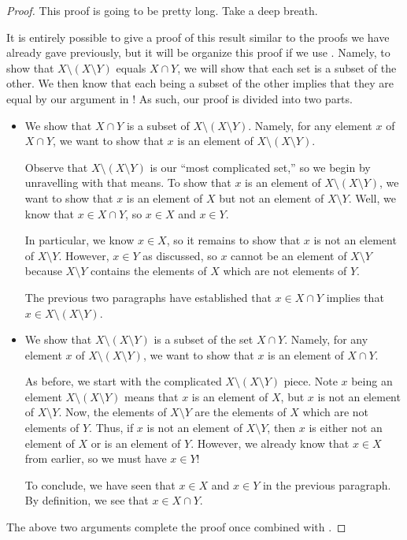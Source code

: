 \documentclass[../notes.tex]{subfiles}
\begin{document}
\begin{proof}
    This proof is going to be pretty long. Take a deep breath.

    It is entirely possible to give a proof of this result similar to the proofs we have already gave previously, but it will be organize this proof if we use . Namely, to show that $X\setminus(X\setminus Y)$ equals $X\cap Y$, we will show that each set is a subset of the other. We then know that each being a subset of the other implies that they are equal by our argument in ! As such, our proof is divided into two parts.
    \begin{itemize}
        \item We show that $X\cap Y$ is a subset of $X\setminus(X\setminus Y)$. Namely, for any element $x$ of $X\cap Y$, we want to show that $x$ is an element of $X\setminus(X\setminus Y)$.

        Observe that $X\setminus(X\setminus Y)$ is our ``most complicated set,'' so we begin by unravelling with that means. To show that $x$ is an element of $X\setminus(X\setminus Y)$, we want to show that $x$ is an element of $X$ but not an element of $X\setminus Y$. Well, we know that $x\in X\cap Y$, so $x\in X$ and $x\in Y$.
        
        In particular, we know $x\in X$, so it remains to show that $x$ is not an element of $X\setminus Y$. However, $x\in Y$ as discussed, so $x$ cannot be an element of $X\setminus Y$ because $X\setminus Y$ contains the elements of $X$ which are not elements of $Y$.

        The previous two paragraphs have established that $x\in X\cap Y$ implies that $x\in X\setminus(X\setminus Y)$.
        
        \item We show that $X\setminus(X\setminus Y)$ is a subset of the set $X\cap Y$. Namely, for any element $x$ of $X\setminus(X\setminus Y)$, we want to show that $x$ is an element of $X\cap Y$.
        
        As before, we start with the complicated $X\setminus(X\setminus Y)$ piece. Note $x$ being an element $X\setminus(X\setminus Y)$ means that $x$ is an element of $X$, but $x$ is not an element of $X\setminus Y$. Now, the elements of $X\setminus Y$ are the elements of $X$ which are not elements of $Y$. Thus, if $x$ is not an element of $X\setminus Y$, then $x$ is either not an element of $X$ or is an element of $Y$. However, we already know that $x\in X$ from earlier, so we must have $x\in Y$!

        To conclude, we have seen that $x\in X$ and $x\in Y$ in the previous paragraph. By definition, we see that $x\in X\cap Y$.
    \end{itemize}
    The above two arguments complete the proof once combined with .
\end{proof}
\end{document}

